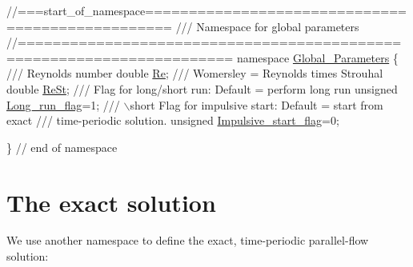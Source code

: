  
\begin{DoxyCodeInclude}
\textcolor{comment}{//===start\_of\_namespace=================================================}
\textcolor{comment}{/// Namespace for global parameters}
\textcolor{comment}{}\textcolor{comment}{//======================================================================}
\textcolor{keyword}{namespace }\hyperlink{namespaceGlobal__Parameters}{Global\_Parameters}
\{\textcolor{comment}{}
\textcolor{comment}{ /// Reynolds number}
\textcolor{comment}{} \textcolor{keywordtype}{double} \hyperlink{namespaceGlobal__Parameters_a9d72e94a9305c6a310940a6a427ebe06}{Re};
\textcolor{comment}{}
\textcolor{comment}{ /// Womersley = Reynolds times Strouhal}
\textcolor{comment}{} \textcolor{keywordtype}{double} \hyperlink{namespaceGlobal__Parameters_a7a59a32365e87566069e458dc83bd18a}{ReSt};
\textcolor{comment}{}
\textcolor{comment}{ /// Flag for long/short run: Default =  perform long run}
\textcolor{comment}{} \textcolor{keywordtype}{unsigned} \hyperlink{namespaceGlobal__Parameters_a457472b8222bb6bb0d97b2aed78d1ef4}{Long\_run\_flag}=1;
\textcolor{comment}{}
\textcolor{comment}{ /// \(\backslash\)short Flag for impulsive start: Default = start from exact}
\textcolor{comment}{ /// time-periodic solution. }
\textcolor{comment}{} \textcolor{keywordtype}{unsigned} \hyperlink{namespaceGlobal__Parameters_aec41eb8da4929003e5d78ef4b43c0ed9}{Impulsive\_start\_flag}=0;

\} \textcolor{comment}{// end of namespace}

\end{DoxyCodeInclude}




 

\hypertarget{index_exact}{}\section{The exact solution}\label{index_exact}
We use another namespace to define the exact, time-\/periodic parallel-\/flow solution\+:

